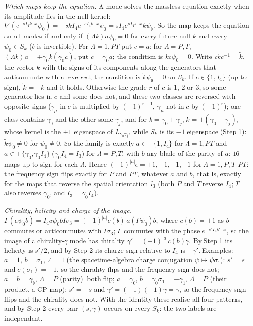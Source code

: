 \emph{Which maps keep the equation.} A mode solves the massless equation exactly when its amplitude lies in the null kernel: $\nabla(e^{-sI_{4}k\cdot x}\psi_{0}) = -sk I_{4}e^{-sI_{4}k\cdot x}\psi_{0} = sI_{4}e^{sI_{4}k\cdot x}k\psi_{0}$. So the map keeps the equation on all modes if and only if $(\Lambda k)a\psi_{0} = 0$ for every future null $k$ and every $\psi_{0} \in S_{k}$ ($b$ is invertible). For $\Lambda = 1, PT$ put $c = a$; for $\Lambda = P, T$, $(\Lambda k)a = \pm\gamma_{0}k(\gamma_{0}a)$, put $c = \gamma_{0}a$; the condition is $kc\psi_{0} = 0$. Write $ckc^{-1} = \tilde k$, the vector $k$ with the signs of its components along the generators that anticommute with $c$ reversed; the condition is $\tilde k\psi_{0} = 0$ on $S_{k}$. If $c \in \{1, I_{4}\}$ (up to sign), $\tilde k = \pm k$ and it holds. Otherwise the grade $r$ of $c$ is $1$, $2$ or $3$, so some generator lies in $c$ and some does not, and these two classes are reversed with opposite signs ($\gamma_{\mu}$ in $c$ is multiplied by $(-1)^{r-1}$, $\gamma_{\mu}$ not in $c$ by $(-1)^{r}$); one class contains $\gamma_{0}$ and the other some $\gamma_{j}$, and for $k = \gamma_{0} + \gamma_{j}$, $\tilde k = \pm(\gamma_{0} - \gamma_{j})$, whose kernel is the $+1$ eigenspace of $L_{\gamma_{0}\gamma_{j}}$, while $S_{k}$ is its $-1$ eigenspace (Step 1): $\tilde k\psi_{0} \ne 0$ for $\psi_{0} \ne 0$. So the family is exactly $a \in \pm\{1, I_{4}\}$ for $\Lambda = 1, PT$ and $a \in \pm\{\gamma_{0}, \gamma_{0}I_{4}\}$ ($\gamma_{0}I_{4} = I_{3}$) for $\Lambda = P, T$, with $b$ any blade of the parity of $a$: $16$ maps up to sign for each $\Lambda$. Hence $(-1)^{|a|}\epsilon = +1, -1, +1, -1$ for $\Lambda = 1, P, T, PT$: the frequency sign flips exactly for $P$ and $PT$, whatever $a$ and $b$, that is, exactly for the maps that reverse the spatial orientation $I_{3}$ (both $P$ and $T$ reverse $I_{4}$; $T$ also reverses $\gamma_{0}$, and $I_{3} = \gamma_{0}I_{4}$).

\emph{Chirality, helicity and charge of the image.} $\Gamma(a\psi_{0}b) = I_{4}a\psi_{0}bI\sigma_{3} = (-1)^{|a|}c(b)\,a(\Gamma\psi_{0})b$, where $c(b) = \pm 1$ as $b$ commutes or anticommutes with $I\sigma_{3}$; $\Gamma$ commutes with the phase $e^{-s'I_{4}k'\cdot x}$, so the image of a chirality-$\gamma$ mode has chirality $\gamma' = (-1)^{|a|}c(b)\gamma$. By Step 1 its helicity is $s'/2$, and by Step 2 its charge sign relative to $I_{4}$ is $-\gamma'$. Examples: $a = 1$, $b = \sigma_{1}$, $\Lambda = 1$ (the spacetime-algebra charge conjugation $\psi \mapsto \psi\sigma_{1}$): $s' = s$ and $c(\sigma_{1}) = -1$, so the chirality flips and the frequency sign does not; $a = b = \gamma_{0}$, $\Lambda = P$ (parity): both flip; $a = \gamma_{0}$, $b = \gamma_{0}\sigma_{1} = -\gamma_{1}$, $\Lambda = P$ (their product, a CP map): $s' = -s$ and $\gamma' = (-1)(-1)\gamma = \gamma$, so the frequency sign flips and the chirality does not. With the identity these realise all four patterns, and by Step 2 every pair $(s, \gamma)$ occurs on every $S_{k}$: the two labels are independent.

